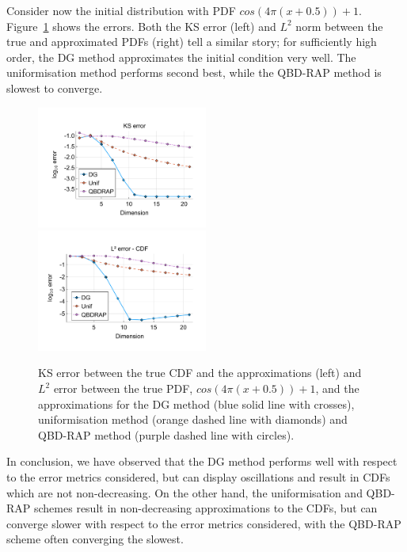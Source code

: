 \begin{example}Consider now the initial distribution with PDF \(cos(4\pi(x+0.5))+1\). Figure~\ref{fig: fun 9 comp} shows the errors. Both the KS error (left) and \(L^2\) norm between the true and approximated PDFs (right) tell a similar story; for sufficiently high order, the DG method approximates the initial condition very well. The uniformisation method performs second best, while the QBD-RAP method is slowest to converge. 
\begin{figure}[h]
	\centering
	\includegraphics[width=0.5\textwidth,trim={1.25cm 0.8cm 0.25cm 1.25cm},clip]{chapter6/figs/comp/fun9/meshs_ks_error_formatted.pdf}%
	\includegraphics[width=0.5\textwidth,trim={1.25cm 0.8cm 0.25cm 1.25cm},clip]{chapter6/figs/comp/fun9/meshs_l2_pdf_error_formatted.pdf}
	\caption{KS error between the true CDF and the approximations (left) and \(L^2\) error between the true PDF, \(cos(4\pi(x+0.5))+1\), and the approximations for the DG method (blue solid line with crosses), uniformisation method (orange dashed line with diamonds) and QBD-RAP method (purple dashed line with circles).}
	\label{fig: fun 9 comp} 
\end{figure}
\exampleFloatBarrier
\end{example}

In conclusion, we have observed that the DG method performs well with respect to the error metrics considered, but can display oscillations and result in CDFs which are not non-decreasing. On the other hand, the uniformisation and QBD-RAP schemes result in non-decreasing approximations to the CDFs, but can converge slower with respect to the error metrics considered, with the QBD-RAP scheme often converging the slowest.
\FloatBarrier


